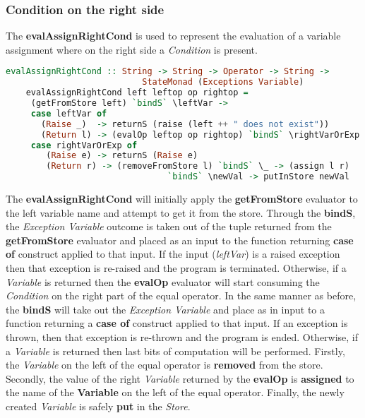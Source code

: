 \documentclass[a4paper, onecolumn]{article}
\begin{document}
    \subsubsection{Condition on the right side}
    
    The \textbf{evalAssignRightCond} is used to represent the evaluation of a variable assignment where on the right side a \textit{Condition} is present.
    
    \begin{tcolorbox}
    \begin{lstlisting}[language=Haskell] 
    evalAssignRightCond :: String -> String -> Operator -> String ->
                           StateMonad (Exceptions Variable)
    evalAssignRightCond left leftop op rightop = 
     (getFromStore left) `bindS` \leftVar -> 
     case leftVar of 
       (Raise _)  -> returnS (raise (left ++ " does not exist"))
       (Return l) -> (evalOp leftop op rightop) `bindS` \rightVarOrExp -> 
     case rightVarOrExp of 
        (Raise e) -> returnS (Raise e)
        (Return r) -> (removeFromStore l) `bindS` \_ -> (assign l r) 
                                `bindS` \newVal -> putInStore newVal
    \end{lstlisting}
    \end{tcolorbox}
    
    \noindent The \textbf{evalAssignRightCond} will initially apply the \textbf{getFromStore} evaluator to the left variable name and attempt to get it from the store. Through the \textbf{bindS}, the \textit{Exception Variable} outcome is taken out of the tuple returned from the \textbf{getFromStore} evaluator and placed as an input to the function returning \textbf{case of} construct applied to that input. If the input (\textit{leftVar}) is a raised exception then that exception is re-raised and the program is terminated. Otherwise, if a \textit{Variable} is returned then the \textbf{evalOp} evaluator will start consuming the \textit{Condition} on the right part of the equal operator. In the same manner as before, the \textbf{bindS} will take out the \textit{Exception Variable} and place as in input to a function returning a \textbf{case of} construct applied to that input. If an exception is thrown, then that exception is re-thrown and the program is ended. Otherwise, if a \textit{Variable} is returned then last bits of computation will be performed. Firstly, the \textit{Variable} on the left of the equal operator is \textbf{removed} from the store. Secondly, the value of the right \textit{Variable} returned by the \textbf{evalOp} is \textbf{assigned} to the name of the \textbf{Variable} on the left of the equal operator. Finally, the newly created \textit{Variable} is safely \textbf{put} in the \textit{Store}. 
    
\end{document}
